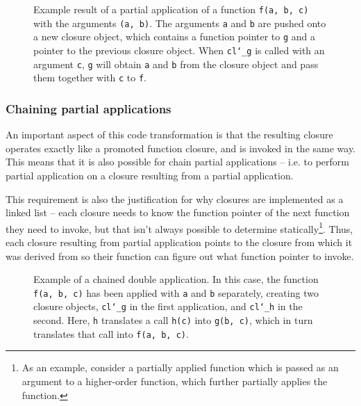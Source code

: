 \documentclass[12pt,a4paper,twoside,openright]{report}
\begin{document}
\begin{figure}
    \label{fig:partial-app}
    \centering
    
    \caption{Example result of a partial application of a function \texttt{f(a, 
    b, c)} with the arguments \texttt{(a, b)}. The arguments \texttt{a} and 
    \texttt{b} are pushed onto a new closure object, which contains a function 
    pointer to \texttt{g} and a pointer to the previous closure object. When 
    \texttt{cl\char`_g} is called with an argument \texttt{c}, \texttt{g} will 
    obtain \texttt{a} and \texttt{b} from the closure object and pass them 
    together with \texttt{c} to \texttt{f}.}
\end{figure}

\subsubsection{Chaining partial applications}

An important aspect of this code transformation is that the resulting closure 
operates exactly like a promoted function closure, and is invoked in the same 
way. This means that it is also possible for chain partial applications -- i.e. 
to perform partial application on a closure resulting from a partial 
application.

This requirement is also the justification for why closures are implemented as 
a linked list -- each closure needs to know the function pointer of the next 
function they need to invoke, but that isn't always possible to determine 
statically\footnote{As an example, consider a partially applied function which 
is passed as an argument to a higher-order function, which further partially 
applies the function.}. Thus, each closure resulting from partial application 
points to the closure from which it was derived from so their function can 
figure out what function pointer to invoke.

\begin{figure}
    \label{fig:double-partial-app}
    \centering
    
    \caption{Example of a chained double application. In this case, the 
    function \texttt{f(a, b, c)} has been applied with \texttt{a} and 
    \texttt{b} separately, creating two closure objects, \texttt{cl\char`_g} in 
    the first application, and \texttt{cl\char`_h} in the second. Here, 
    \texttt{h} translates a call \texttt{h(c)} into \texttt{g(b, c)}, which in 
    turn translates that call into \texttt{f(a, b, c)}.}
\end{figure}
\end{document}
